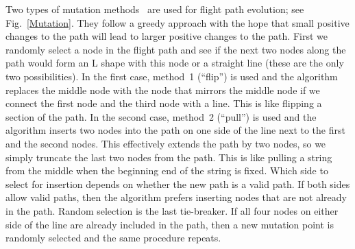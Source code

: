 Two types of mutation methods~\cite{Mitchell1997Machine} are used for flight path evolution; see Fig.~\ref{Mutation}. They follow a greedy approach with the hope that small positive changes to the path will lead to larger positive changes to the path. First we randomly select a node in the flight path and see if the next two nodes along the path would form an L shape with this node or a straight line (these are the only two possibilities). In the first case, method~1 (``flip'') is used and the algorithm replaces the middle node with the node that mirrors the middle node if we connect the first node and the third node with a line. This is like flipping a section of the path. In the second case, method~2 (``pull'') is used and the algorithm inserts two nodes into the path on one side of the line next to the first and the second nodes. This effectively extends the path by two nodes, so we simply truncate the last two nodes from the path. This is like pulling a string from the middle when the beginning end of the string is fixed. Which side to select for insertion depends on whether the new path is a valid path. If both sides allow valid paths, then the algorithm prefers inserting nodes that are not already in the path. Random selection is the last tie-breaker. If all four nodes on either side of the line are already included in the path, then a new mutation point is randomly selected and the same procedure repeats.


